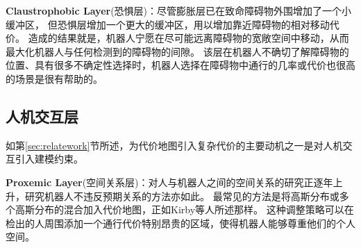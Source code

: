 \textbf{\color{blue}Claustrophobic Layer}(恐惧层)：尽管膨胀层已在致命障碍物外围增加了一个小缓冲区，
但恐惧层增加一个更大的缓冲区，用以增加靠近障碍物的相对移动代价。 
造成的结果就是，机器人宁愿在尽可能远离障碍物的宽敞空间中移动，从而最大化机器人与任何检测到的障碍物的间隙。 
该层在机器人不确切了解障碍物的位置、具有很多不确定性选择时，机器人选择在障碍物中通行的几率或代价也很高的场景是很有帮助的。



\subsection{人机交互层}
如第\ref{sec:relatework}节所述，为代价地图引入复杂代价的主要动机之一是对人机交互引入建模约束。

\textbf{\color{blue}Proxemic Layer}(空间关系层)：对人与机器人之间的空间关系的研究正逐年上升，研究机器人不违反预期关系的方法亦如此。 
最常见的方法是将高斯分布或多个高斯分布的混合加入代价地图，正如Kirby等人所述那样\cite{kirby2009companion}。 这种调整策略可以在检出的人周围添加一个通行代价特别昂贵的区域，使得机器人能够尊重他们的个人空间。

